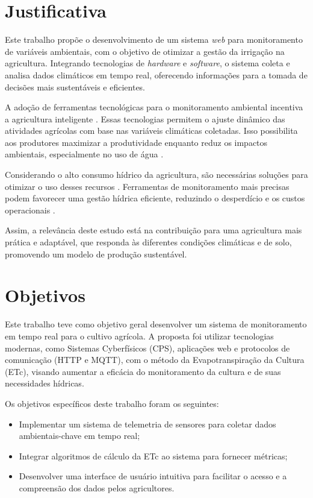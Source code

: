 \section{Justificativa}

Este trabalho propõe o desenvolvimento de um sistema \textit{web} para monitoramento de variáveis ambientais, com o objetivo de otimizar a gestão da irrigação na agricultura. Integrando tecnologias de \textit{hardware} e \textit{software}, o sistema coleta e analisa dados climáticos em tempo real, oferecendo informações para a tomada de decisões mais sustentáveis e eficientes.

A adoção de ferramentas tecnológicas para o monitoramento ambiental incentiva a agricultura inteligente \parencite{Garg_smart2023}. Essas tecnologias permitem o ajuste dinâmico das atividades agrícolas com base nas variáveis climáticas coletadas. Isso possibilita aos produtores maximizar a produtividade enquanto reduz os impactos ambientais, especialmente no uso de água \parencite{Gurjeet_smart2022}.

Considerando o alto consumo hídrico da agricultura, são necessárias soluções para otimizar o uso desses recursos \parencite{Ramos_irrigacao2022}. Ferramentas de monitoramento mais precisas podem favorecer uma gestão hídrica eficiente, reduzindo o desperdício e os custos operacionais \parencite{carmody_fao2023}.

Assim, a relevância deste estudo está na contribuição para uma agricultura mais prática e adaptável, que responda às diferentes condições climáticas e de solo, promovendo um modelo de produção sustentável.

\section{Objetivos}

Este trabalho teve como objetivo geral desenvolver um sistema de monitoramento em tempo real para o cultivo agrícola. A proposta foi utilizar tecnologias modernas, como Sistemas Cyberfísicos (CPS), aplicações web e protocolos de comunicação (HTTP e MQTT), com o método da Evapotranspiração da Cultura (ETc), visando aumentar a eficácia do monitoramento da cultura e de suas necessidades hídricas.

Os objetivos específicos deste trabalho foram os seguintes:

\begin{itemize}
    \item Implementar um sistema de telemetria de sensores para coletar dados ambientais-chave em tempo real;
    \item Integrar algoritmos de cálculo da ETc ao sistema para fornecer métricas;
    \item Desenvolver uma interface de usuário intuitiva para facilitar o acesso e a compreensão dos dados pelos agricultores.
\end{itemize}

